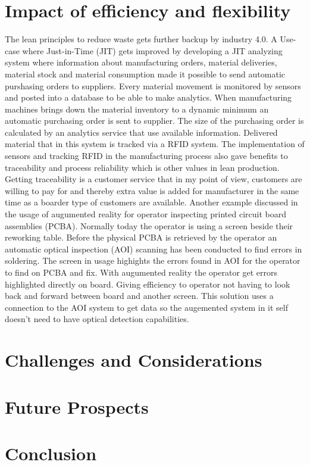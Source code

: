 \documentclass[article,a4paper]{IEEEtran}
\begin{document}
    \section{Impact of efficiency and flexibility}
    The lean principles to reduce waste gets further backup by industry 4.0. A Use-case where Just-in-Time (JIT) gets improved by developing a JIT analyzing system where information about manufacturing orders, material deliveries, material stock and material consumption made it possible to send automatic purshasing orders to suppliers. Every material movement is monitored by sensors and posted into a database to be able to make analytics. When manufacturing machines brings down the material inventory to a dynamic minimum an automatic purchasing order is sent to supplier. The size of the purchasing order is calculated by an analytics service that use available information. Delivered material that in this system is tracked via a RFID system. The implementation of sensors and tracking RFID in the manufacturing process also gave benefits to traceability \cite{Impact_Lean_Prod} and process reliability which is other values in lean production. Getting traceability is a customer service that in my point of view, customers are willing to pay for and thereby extra value is added for manufacturer in the same time as a boarder type of customers are available.  
    \newline\newline
    Another example discussed in \cite{AugPCBA1}\cite{AugPCBA2} the usage of augumented reality for operator inspecting printed circuit board assemblies (PCBA). Normally today the operator is using a screen beside their reworking table. Before the physical PCBA is retrieved by the operator an automatic optical inspection (AOI) scanning has been conducted to find errors in soldering. The screen in usage highights the errors found in AOI for the operator to find on PCBA and fix. With augumented reality the operator get errors highlighted directly on board. Giving efficiency to operator not having to look back and forward between board and another screen. This solution uses a connection to the AOI system to get data so the augemented system in it self doesn't need to have optical detection capabilities.   
    
    
    \section{Challenges and Considerations}

    \section{Future Prospects}

    \section{Conclusion}


\printbibliography
\end{document}

